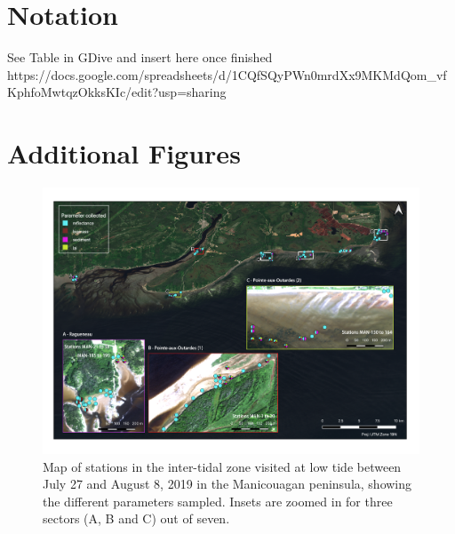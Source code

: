 \documentclass[essd, manuscript]{copernicus}
\begin{document}






\appendix
\section{Notation}    %
See Table in GDive and insert here once finished
https://docs.google.com/spreadsheets/d/1CQfSQyPWn0mrdXx9MKMdQom\_vfKphfoMwtqzOkksKIc/edit?usp=sharing



\section{Additional Figures}\label{appendixfig}  
\begin{figure}
    \centering
    \includegraphics[width=18cm]{Figures/Fig2a_annexe_intertidal__A_B_C_v2.png}
    \caption{Map of stations in the inter-tidal zone visited at low tide between July 27 and August 8, 2019 in the Manicouagan peninsula, showing the different parameters sampled. Insets are zoomed in for three sectors (A, B and C) out of seven. }
    \label{fig:intertidal1_annexe}
    
\end{figure}
\end{document}
